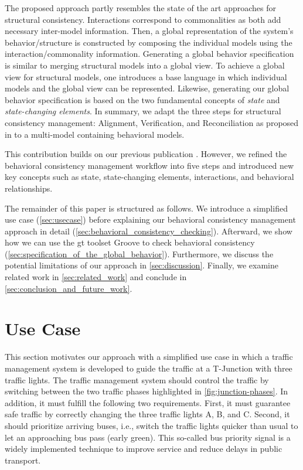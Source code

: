 \documentclass{jot}
\begin{document}
The proposed approach partly resembles the state of the art approaches for structural consistency.
Interactions correspond to commonalities as both add necessary inter-model information.
Then, a global representation of the system's behavior/structure is constructed by composing the individual models using the interaction/commonality information.
Generating a global behavior specification is similar to merging structural models into a global view.
To achieve a global view for structural models, one introduces a base language in which individual models and the global view can be represented.
Likewise, generating our global behavior specification is based on the two fundamental concepts of \textit{state} and \textit{state-changing elements}.
In summary, we adapt the three steps for structural consistency management: Alignment, Verification, and Reconciliation as proposed in \cite{stunkelComprehensiveSystemsFormal2021} to a multi-model containing behavioral models.

This contribution builds on our previous publication \cite{krauterBehavioralConsistencyHeterogeneous2021}.
However, we refined the behavioral consistency management workflow into five steps and introduced new key concepts such as state, state-changing elements, interactions, and behavioral relationships.

The remainder of this paper is structured as follows.
We introduce a simplified use case (\autoref{sec:usecase}) before explaining our behavioral consistency management approach in detail (\autoref{sec:behavioral_consistency_checking}).
Afterward, we show how we can use the \gls*{gt} toolset Groove to check behavioral consistency (\autoref{sec:specification_of_the_global_behavior}).
Furthermore, we discuss the potential limitations of our approach in \autoref{sec:discussion}.
Finally, we examine related work in \autoref{sec:related_work} and conclude in \autoref{sec:conclusion_and_future_work}.


\section{Use Case} \label{sec:usecase}
This section motivates our approach with a simplified use case in which a traffic management system is developed to guide the traffic at a T-Junction with three traffic lights.
The traffic management system should control the traffic by switching between the two traffic phases highlighted in \cref{fig:junction-phases}.
In addition, it must fulfill the following two requirements.
First, it must guarantee safe traffic by correctly changing the three traffic lights A, B, and C.
Second, it should prioritize arriving buses, i.e., switch the traffic lights quicker than usual to let an approaching bus pass (early green).
This so-called bus priority signal is a widely implemented technique to improve service and reduce delays in public transport.
\end{document}
